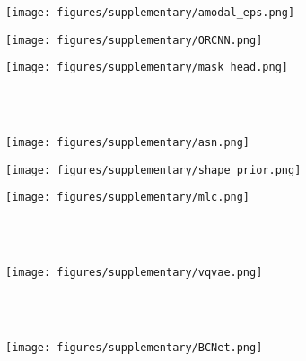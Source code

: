 \documentclass[10pt,twocolumn,letterpaper]{article}
\begin{document}
\begin{figure*}
    \centering
    \begin{subfigure}[b]{0.20\linewidth}
        \centering
        \texttt{[image: figures/supplementary/amodal\_eps.png]}
        \label{amodal_eps}
    \end{subfigure}
        \hfill
    \begin{subfigure}[b]{0.3\linewidth}
        \centering
        \texttt{[image: figures/supplementary/ORCNN.png]}
        \label{orcnn}
    \end{subfigure}
    \hfill
        \begin{subfigure}[b]{0.3\linewidth}
        \centering
        \texttt{[image: figures/supplementary/mask\_head.png]}
\end{subfigure}
   \\
   \hfill
   \\
    \begin{subfigure}[b]{0.2\linewidth}
        \centering
        \texttt{[image: figures/supplementary/asn.png]}
        \label{ASN}
    \end{subfigure}
    \hfill
    \begin{subfigure}[b]{0.40\linewidth}
        \centering
        \texttt{[image: figures/supplementary/shape\_prior.png]}
        \label{shape_prior}
    \end{subfigure}
    \hfill
    \begin{subfigure}[b]{0.35\linewidth}
        \centering
        \texttt{[image: figures/supplementary/mlc.png]}
\end{subfigure}
   \\
   \hfill
   \\
    \begin{subfigure}[b]{0.5\linewidth}
        \centering
        \texttt{[image: figures/supplementary/vqvae.png]}
        \label{vqvae}
    \end{subfigure}
   \\
   \hfill
   \\
    \begin{subfigure}[b]{0.3\linewidth}
        \centering
        \texttt{[image: figures/supplementary/BCNet.png]}
        \label{bcnet}
    \end{subfigure}

\end{figure*}
\end{document}
